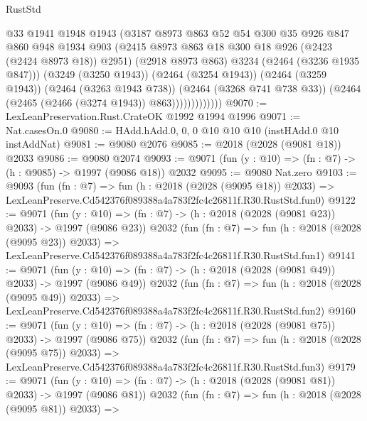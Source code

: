 \begin{lexlean}{RustStd}
\begin{coremodule}
                          @33
                          @1941
                          @1948
                          @1943
                          (@3187
                            @8973
                            @863
                            @52
                            @54
                            @300
                            @35
                            @926
                            @847
                            @860
                            @948
                            @1934
                            @903
                            (@2415 @8973 @863 @18 @300 @18 @926 (@2423 (@2424 @8973 @18)) @2951)
                            (@2918 @8973 @863)
                            @3234
                            (@2464 (@3236 @1935 @847)))
                          (@3249 (@3250 @1943))
                          (@2464 (@3254 @1943))
                          (@2464 (@3259 @1943))
                          (@2464 (@3263 @1943 @738))
                          (@2464 (@3268 @741 @738 @33))
                          (@2464 (@2465 (@2466 (@3274 @1943)) @863)))))))))))))
@9070 := LexLeanPreservation.Rust.CrateOK @1992 @1994 @1996
@9071 := Nat.casesOn.{0}
@9080 := HAdd.hAdd.{0, 0, 0} @10 @10 @10 (instHAdd.{0} @10 instAddNat)
@9081 := @9080 @2076
@9085 := @2018 (@2028 (@9081 @18)) @2033
@9086 := @9080 @2074
@9093 := @9071 (fun (y : @10) => (fn : @7) -> (h : @9085) -> @1997 (@9086 @18)) @2032
@9095 := @9080 Nat.zero
@9103 := @9093
    (fun (fn : @7) =>
    fun (h : @2018 (@2028 (@9095 @18)) @2033) =>
    LexLeanPreserve.Cd542376f089388a4a783f2fc4c26811f.R30.RustStd.fun0)
@9122 := @9071
    (fun (y : @10) => (fn : @7) -> (h : @2018 (@2028 (@9081 @23)) @2033) -> @1997 (@9086 @23))
    @2032
    (fun (fn : @7) =>
    fun (h : @2018 (@2028 (@9095 @23)) @2033) =>
    LexLeanPreserve.Cd542376f089388a4a783f2fc4c26811f.R30.RustStd.fun1)
@9141 := @9071
    (fun (y : @10) => (fn : @7) -> (h : @2018 (@2028 (@9081 @49)) @2033) -> @1997 (@9086 @49))
    @2032
    (fun (fn : @7) =>
    fun (h : @2018 (@2028 (@9095 @49)) @2033) =>
    LexLeanPreserve.Cd542376f089388a4a783f2fc4c26811f.R30.RustStd.fun2)
@9160 := @9071
    (fun (y : @10) => (fn : @7) -> (h : @2018 (@2028 (@9081 @75)) @2033) -> @1997 (@9086 @75))
    @2032
    (fun (fn : @7) =>
    fun (h : @2018 (@2028 (@9095 @75)) @2033) =>
    LexLeanPreserve.Cd542376f089388a4a783f2fc4c26811f.R30.RustStd.fun3)
@9179 := @9071
    (fun (y : @10) => (fn : @7) -> (h : @2018 (@2028 (@9081 @81)) @2033) -> @1997 (@9086 @81))
    @2032
    (fun (fn : @7) =>
    fun (h : @2018 (@2028 (@9095 @81)) @2033) =>

\end{coremodule}
\end{lexlean}
